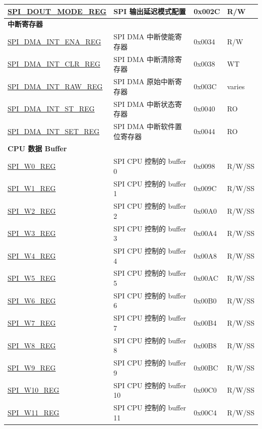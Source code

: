 \begin{longtable}{ | p{5.5cm} | p{7.2cm} | p{1.3cm} | p{1.5cm} | }
\hyperref[regdesc:SPIDOUTMODEREG]{SPI\_DOUT\_MODE\_REG} & SPI 输出延迟模式配置 & 0x002C & R/W \\ \hline
\multicolumn{4}{|l|}{\textbf{中断寄存器}} \\ \hline
\hyperref[regdesc:SPIDMAINTENAREG]{SPI\_DMA\_INT\_ENA\_REG} & SPI DMA 中断使能寄存器 & 0x0034 & R/W \\ \hline
\hyperref[regdesc:SPIDMAINTCLRREG]{SPI\_DMA\_INT\_CLR\_REG} & SPI DMA 中断清除寄存器 & 0x0038 & WT \\ \hline
\hyperref[regdesc:SPIDMAINTRAWREG]{SPI\_DMA\_INT\_RAW\_REG} & SPI DMA 原始中断寄存器 & 0x003C & varies \\ \hline
\hyperref[regdesc:SPIDMAINTSTREG]{SPI\_DMA\_INT\_ST\_REG} & SPI DMA 中断状态寄存器 & 0x0040 & RO \\ \hline
\hyperref[regdesc:SPIDMAINTSETREG]{SPI\_DMA\_INT\_SET\_REG} & SPI DMA 中断软件置位寄存器 & 0x0044 & RO \\ \hline
\multicolumn{4}{|l|}{\textbf{CPU 数据 Buffer}} \\ \hline
\hyperref[regdesc:SPIW0REG]{SPI\_W0\_REG} & SPI CPU 控制的 buffer 0 & 0x0098 & R/W/SS \\ \hline
\hyperref[regdesc:SPIW0REG]{SPI\_W1\_REG} & SPI CPU 控制的 buffer 1 & 0x009C & R/W/SS \\ \hline
\hyperref[regdesc:SPIW0REG]{SPI\_W2\_REG} & SPI CPU 控制的 buffer 2 & 0x00A0 & R/W/SS \\ \hline
\hyperref[regdesc:SPIW0REG]{SPI\_W3\_REG} & SPI CPU 控制的 buffer 3 & 0x00A4 & R/W/SS \\ \hline
\hyperref[regdesc:SPIW0REG]{SPI\_W4\_REG} & SPI CPU 控制的 buffer 4 & 0x00A8 & R/W/SS \\ \hline
\hyperref[regdesc:SPIW0REG]{SPI\_W5\_REG} & SPI CPU 控制的 buffer 5 & 0x00AC & R/W/SS \\ \hline
\hyperref[regdesc:SPIW0REG]{SPI\_W6\_REG} & SPI CPU 控制的 buffer 6 & 0x00B0 & R/W/SS \\ \hline
\hyperref[regdesc:SPIW0REG]{SPI\_W7\_REG} & SPI CPU 控制的 buffer 7 & 0x00B4 & R/W/SS \\ \hline
\hyperref[regdesc:SPIW0REG]{SPI\_W8\_REG} & SPI CPU 控制的 buffer 8 & 0x00B8 & R/W/SS \\ \hline
\hyperref[regdesc:SPIW0REG]{SPI\_W9\_REG} & SPI CPU 控制的 buffer 9 & 0x00BC & R/W/SS \\ \hline
\hyperref[regdesc:SPIW0REG]{SPI\_W10\_REG} & SPI CPU 控制的 buffer 10 & 0x00C0 & R/W/SS \\ \hline
\hyperref[regdesc:SPIW0REG]{SPI\_W11\_REG} & SPI CPU 控制的 buffer 11 & 0x00C4 & R/W/SS \\ \hline

\end{longtable}
